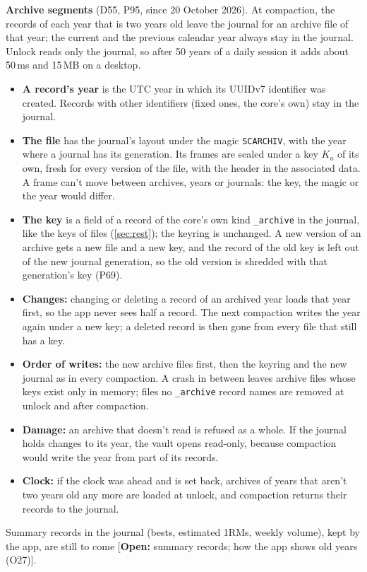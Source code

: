 \documentclass[11pt,a4paper]{article}
\newcommand{\todo}[1]{\textcolor{red!70!black}{[\textbf{Open:} #1]}}
\newcommand{\dref}[1]{\textsf{#1}} %
\begin{document}
\noindent\textbf{Archive segments} (\dref{D55}, \dref{P95}, since 20 October 2026). At compaction, the records of each year that is two years old leave the journal for an archive file of that year; the current and the previous calendar year always stay in the journal. Unlock reads only the journal, so after 50 years of a daily session it adds about 50\,ms and 15\,MB on a desktop.
\begin{itemize}
  \item \textbf{A record's year} is the UTC year in which its UUIDv7 identifier was created. Records with other identifiers (fixed ones, the core's own) stay in the journal.
  \item \textbf{The file} has the journal's layout under the magic \texttt{SCARCHIV}, with the year where a journal has its generation. Its frames are sealed under a key $K_{a}$ of its own, fresh for every version of the file, with the header in the associated data. A frame can't move between archives, years or journals: the key, the magic or the year would differ.
  \item \textbf{The key} is a field of a record of the core's own kind \texttt{\_archive} in the journal, like the keys of files (\cref{sec:rest}); the keyring is unchanged. A new version of an archive gets a new file and a new key, and the record of the old key is left out of the new journal generation, so the old version is shredded with that generation's key (\dref{P69}).
  \item \textbf{Changes:} changing or deleting a record of an archived year loads that year first, so the app never sees half a record. The next compaction writes the year again under a new key; a deleted record is then gone from every file that still has a key.
  \item \textbf{Order of writes:} the new archive files first, then the keyring and the new journal as in every compaction. A crash in between leaves archive files whose keys exist only in memory; files no \texttt{\_archive} record names are removed at unlock and after compaction.
  \item \textbf{Damage:} an archive that doesn't read is refused as a whole. If the journal holds changes to its year, the vault opens read-only, because compaction would write the year from part of its records.
  \item \textbf{Clock:} if the clock was ahead and is set back, archives of years that aren't two years old any more are loaded at unlock, and compaction returns their records to the journal.
\end{itemize}
Summary records in the journal (bests, estimated 1RMs, weekly volume), kept by the app, are still to come \todo{summary records; how the app shows old years (O27)}.
\end{document}
